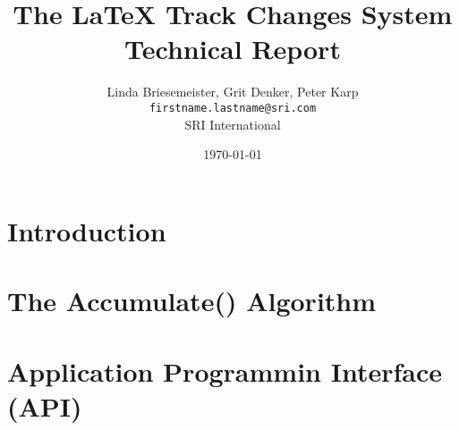 \documentclass{report}
\title{The \LaTeX{} Track Changes System \\ {\large Technical Report}}
\author{%
Linda Briesemeister, Grit Denker, Peter Karp\\
\texttt{firstname.lastname@sri.com}\\
SRI International
}
\date{\today}
\begin{document}
\maketitle

\dominitoc
\tableofcontents

\chapter{Introduction}




\chapter{The Accumulate() Algorithm}

\chapter{Application Programmin Interface (API)}

%
 


%
\appendix

\end{document}
